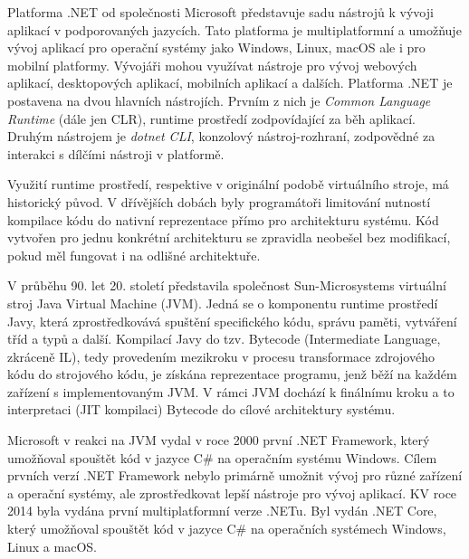 


Platforma .NET od společnosti Microsoft představuje sadu nástrojů k vývoji aplikací v podporovaných jazycích. Tato platforma je multiplatformní a umožňuje vývoj aplikací pro operační systémy jako Windows, Linux, macOS ale i pro mobilní platformy. Vývojáři mohou využívat nástroje pro vývoj webových aplikací, desktopových aplikací, mobilních aplikací a dalších. Platforma .NET je postavena na dvou hlavních nástrojích. Prvním z nich je \textit{Common Language Runtime} (dále jen CLR), runtime prostředí zodpovídající za běh aplikací. Druhým nástrojem je \textit{dotnet CLI}, konzolový nástroj-rozhraní, zodpovědné za interakci s dílčími nástroji v platformě. \cite{Richter2012}


Využití runtime prostředí, respektive v originální podobě virtuálního stroje, má historický původ. V dřívějších dobách byly programátoři limitování nutností kompilace kódu do nativní reprezentace přímo pro architekturu systému. Kód vytvořen pro jednu konkrétní architekturu se zpravidla neobešel bez modifikací, pokud měl fungovat i na odlišné architektuře.

V průběhu 90. let 20. století představila společnost Sun-Microsystems virtuální stroj Java Virtual Machine (JVM). Jedná se o komponentu runtime prostředí Javy, která zprostředkovává spuštění specifického kódu, správu paměti, vytváření tříd a typů a další. Kompilací Javy do tzv. Bytecode (Intermediate Language, zkráceně IL), tedy provedením mezikroku v procesu transformace zdrojového kódu do strojového kódu, je získána reprezentace programu, jenž běží na každém zařízení s implementovaným JVM. V rámci JVM dochází k finálnímu kroku a to interpretaci (JIT kompilaci) Bytecode do cílové architektury systému. 

Microsoft v reakci na JVM vydal v roce 2000 první .NET Framework, který umožňoval spouštět kód v jazyce C\# na operačním systému Windows. Cílem prvních verzí .NET Framework nebylo primárně umožnit vývoj pro různé zařízení a operační systémy, ale zprostředkovat lepší nástroje pro vývoj aplikací. KV roce 2014 byla vydána první multiplatformní verze .NETu. Byl vydán .NET Core, který umožňoval spouštět kód v jazyce C\# na operačních systémech Windows, Linux a macOS. \cite{Richter2012}

